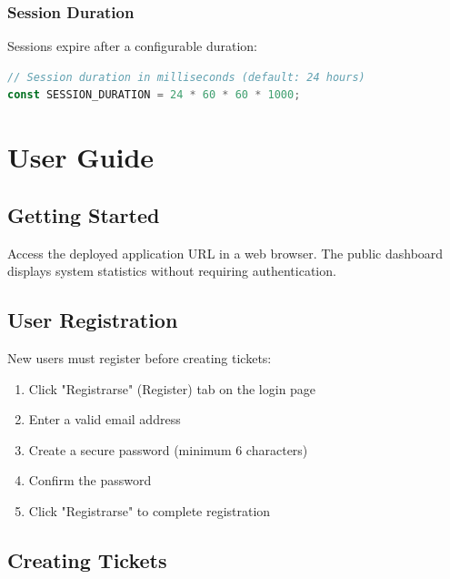 \documentclass[12pt,a4paper]{report}
\begin{document}
\subsection{Session Duration}
\label{sub:session-duration}

Sessions expire after a configurable duration:

\begin{lstlisting}[language=JavaScript, caption={Session Configuration}, label={lst:session}]
// Session duration in milliseconds (default: 24 hours)
const SESSION_DURATION = 24 * 60 * 60 * 1000;
\end{lstlisting}

\cleardoublepage

\chapter{User Guide}
\thispagestyle{fancy}
\label{chap:userguide}

\section{Getting Started}
\label{sec:getting-started}

Access the deployed application URL in a web browser. The public dashboard displays system statistics without requiring authentication.

\section{User Registration}
\label{sec:registration}

New users must register before creating tickets:

\begin{enumerate}
    \item Click "Registrarse" (Register) tab on the login page
    \item Enter a valid email address
    \item Create a secure password (minimum 6 characters)
    \item Confirm the password
    \item Click "Registrarse" to complete registration
\end{enumerate}

\section{Creating Tickets}
\label{sec:creating-tickets}
\end{document}
